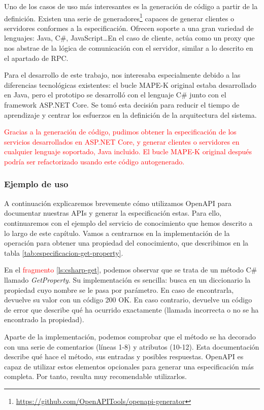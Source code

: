 Uno de los casos de uso más interesantes es la generación de código a partir de la definición. Existen una serie de generadores\footnote{\url{https://github.com/OpenAPITools/openapi-generator}} capaces de generar clientes o servidores conformes a la especificación. Ofrecen soporte a una gran variedad de lenguajes: Java, C\#, JavaScript\dots En el caso de cliente, actúa como un proxy que nos abstrae de la lógica de comunicación con el servidor, similar a lo descrito en el apartado de RPC.

Para el desarrollo de este trabajo, nos interesaba especialmente debido a las diferencias tecnológicas existentes: el bucle MAPE-K original estaba desarrollado en Java, pero el prototipo se desarrolló con el lenguaje C\# junto con el framework ASP.NET Core. Se tomó esta decisión para reducir el tiempo de aprendizaje y centrar los esfuerzos en la definición de la arquitectura del sistema.

\textcolor{red}{Gracias a la generación de código, pudimos obtener la especificación de los servicios desarrollados en ASP.NET Core, y generar clientes o servidores en cualquier lenguaje soportado, Java incluido. El bucle MAPE-K original después podría ser refactorizado usando este código autogenerado.}

\subsubsection{Ejemplo de uso}

A continuación explicaremos brevemente cómo utilizamos OpenAPI para documentar nuestras APIs y generar la especificación estas. Para ello, continuaremos con el ejemplo del servicio de conocimiento que hemos descrito a lo largo de este capítulo. Vamos a centrarnos en la implementación de la operación para obtener una propiedad del conocimiento, que describimos en la tabla \ref{tab:especificacion-get-property}.

En el \textcolor{red}{fragmento} \ref{ls:csharp-get}, podemos observar que se trata de un método C\# llamado \emph{GetProperty}. Su implementación es sencilla: busca en un diccionario la propiedad cuyo nombre se le pasa por parámetro. En caso de encontrarla, devuelve su valor con un código 200 OK. En caso contrario, devuelve un código de error que describe qué ha ocurrido exactamente (llamada incorrecta o no se ha encontrado la propiedad).

Aparte de la implementación, podemos comprobar que el método se ha decorado con una serie de comentarios (líneas 1-8) y atributos (10-12). Esta documentación describe qué hace el método, sus entradas y posibles respuestas. OpenAPI es capaz de utilizar estos elementos opcionales para generar una especificación más completa. Por tanto, resulta muy recomendable utilizarlos.

